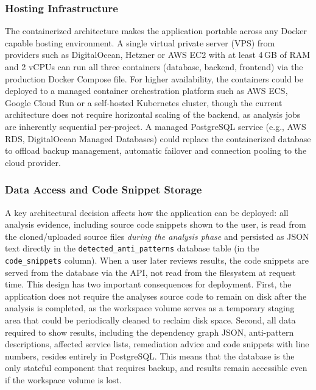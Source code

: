 \subsubsection{Hosting Infrastructure}
\label{subsubsec:hosting}

 \par The containerized architecture makes the application portable across any Docker capable hosting environment. A single virtual private server (VPS) from providers such as DigitalOcean, Hetzner or AWS EC2 with at least 4\,GB of RAM and 2 vCPUs can run all three containers (database, backend, frontend) via the production Docker Compose file. For higher availability, the containers could be deployed to a managed container orchestration platform such as AWS ECS, Google Cloud Run or a self-hosted Kubernetes cluster, though the current architecture does not require horizontal scaling of the backend, as analysis jobs are inherently sequential per-project. A managed PostgreSQL service (e.g., AWS RDS, DigitalOcean Managed Databases) could replace the containerized database to offload backup management, automatic failover and connection pooling to the cloud provider.

\subsubsection{Data Access and Code Snippet Storage}
\label{subsubsec:data-access}

 \par A key architectural decision affects how the application can be deployed: all analysis evidence, including source code snippets shown to the user, is read from the cloned/uploaded source files \textit{during the analysis phase} and persisted as JSON text directly in the \texttt{detected\_anti\_patterns} database table (in the \texttt{code\_snippets} column). When a user later reviews results, the code snippets are served from the database via the API, not read from the filesystem at request time. This design has two important consequences for deployment. First, the application does not require the analyses source code to remain on disk after the analysis is completed, as the workspace volume serves as a temporary staging area that could be periodically cleaned to reclaim disk space. Second, all data required to show results, including the dependency graph JSON, anti-pattern descriptions, affected service lists, remediation advice and code snippets with line numbers, resides entirely in PostgreSQL. This means that the database is the only stateful component that requires backup, and results remain accessible even if the workspace volume is lost.

